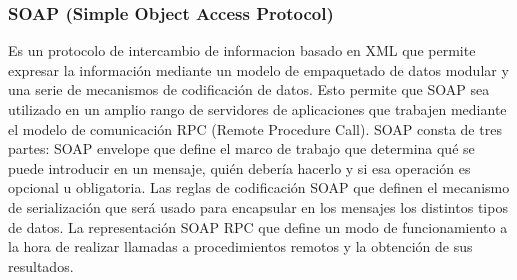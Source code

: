 \subsubsection{SOAP (Simple Object Access Protocol)}

Es un protocolo de intercambio de informacion basado en XML que permite expresar la información mediante un modelo de empaquetado de datos modular y una serie de mecanismos de codificación de datos. Esto permite que SOAP sea utilizado en un amplio rango de servidores de aplicaciones que trabajen mediante el modelo de comunicación RPC (Remote Procedure Call). 
SOAP consta de tres partes: 
SOAP envelope que define el marco de trabajo que determina qué se puede introducir en un mensaje, quién debería hacerlo y si esa operación es opcional u obligatoria.
Las reglas de codificación SOAP que definen el mecanismo de serialización que será usado para encapsular en los mensajes los distintos tipos de datos. 
La representación SOAP RPC que define un modo de funcionamiento a la hora de realizar llamadas a procedimientos remotos y la obtención de sus resultados.
